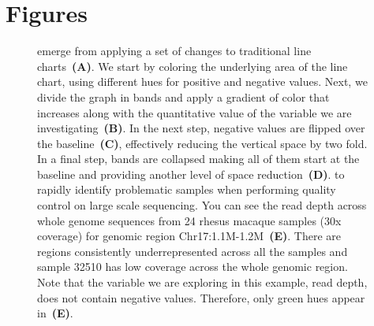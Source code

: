 \documentclass{bmcart}
\begin{document}
\section*{Figures}
\begin{figure}[h!]

\caption{
   emerge from applying a set of changes to traditional line
  charts~\textbf{(A)}. We start by coloring the underlying area of the line chart,
  using different hues for positive and negative values. Next, we divide the
  graph in bands and apply a gradient of color that increases along with the
  quantitative value of the variable we are investigating~\textbf{(B)}. In the
  next step, negative values are flipped over the baseline~\textbf{(C)},
  effectively reducing the vertical space by two fold. In a final step, bands are
  collapsed making all of them start at the baseline and providing another level
  of space reduction~\textbf{(D)}.  
   to rapidly identify problematic samples
  when performing quality control on large scale sequencing.
  You can see the read depth across whole genome sequences from 24 rhesus macaque
  samples (30x coverage) for genomic region Chr17:1.1M-1.2M~\textbf{(E)}.
  There are regions consistently underrepresented across all the
  samples and sample 32510 has low coverage across the whole genomic region.
  Note that the variable we are exploring in this example, read depth, does not
  contain negative values. Therefore, only green hues appear in~\textbf{(E)}.
}\label{fig:01}

\end{figure}





\end{document}
